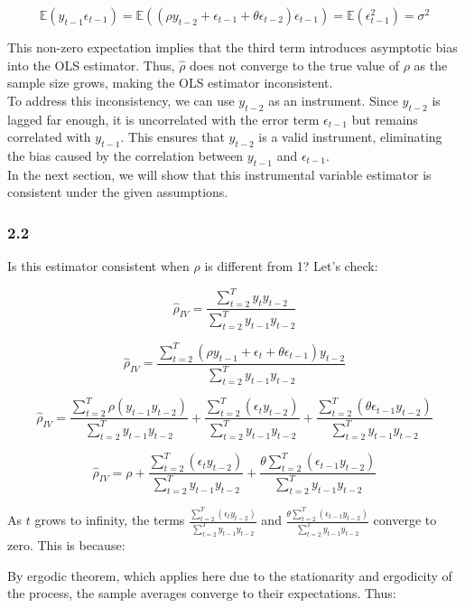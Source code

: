 \documentclass{article}
\begin{document}
\[
\mathbb{E}(y_{t-1}\epsilon_{t-1}) = \mathbb{E}((\rho y_{t-2} + \epsilon_{t-1} + \theta \epsilon_{t-2})\epsilon_{t-1}) = \mathbb{E}(\epsilon_{t-1}^{2}) = \sigma^{2}
\]

This non-zero expectation implies that the third term introduces asymptotic bias into the OLS estimator. Thus, $\hat{\rho}$ does not converge to the true value of $\rho$ as the sample size grows, making the OLS estimator inconsistent. \\

To address this inconsistency, we can use $y_{t-2}$ as an instrument. Since $y_{t-2}$ is lagged far enough, it is uncorrelated with the error term $\epsilon_{t-1}$ but remains correlated with $y_{t-1}$. This ensures that $y_{t-2}$ is a valid instrument, eliminating the bias caused by the correlation between $y_{t-1}$ and $\epsilon_{t-1}$. \\

In the next section, we will show that this instrumental variable estimator is consistent under the given assumptions.

\subsubsection*{2.2}
Is this estimator consistent when $\rho$ is different from 1? Let's check:

\[
\hat{\rho}_{IV}= \frac{\sum_{t=2}^{T} y_{t}y_{t-2}}{\sum_{t=2}^{T} y_{t-1}y_{t-2}}
\]

\[
\hat{\rho}_{IV}= \frac{\sum_{t=2}^{T} (\rho y_{t-1} + \epsilon_{t}+ \theta \epsilon_{t-1} )y_{t-2}}{\sum_{t=2}^{T} y_{t-1}y_{t-2}}
\]

\[
\hat{\rho}_{IV}= \frac{\sum_{t=2}^{T} \rho (y_{t-1}y_{t-2})}{\sum_{t=2}^{T} y_{t-1}y_{t-2}}+\frac{\sum_{t=2}^{T} (\epsilon_{t}y_{t-2})}{\sum_{t=2}^{T} y_{t-1}y_{t-2}}+ \frac{\sum_{t=2}^{T} (\theta\epsilon_{t-1}y_{t-2})}{\sum_{t=2}^{T} y_{t-1}y_{t-2}}
\]

\[
\hat{\rho}_{IV}= \rho +\frac{\sum_{t=2}^{T} (\epsilon_{t}y_{t-2})}{\sum_{t=2}^{T} y_{t-1}y_{t-2}}+ \frac{\theta\sum_{t=2}^{T} (\epsilon_{t-1}y_{t-2})}{\sum_{t=2}^{T} y_{t-1}y_{t-2}}
\]

As $t$ grows to infinity, the terms $\frac{\sum_{t=2}^{T} (\epsilon_{t}y_{t-2})}{\sum_{t=2}^{T} y_{t-1}y_{t-2}}$ and $\frac{\theta\sum_{t=2}^{T} (\epsilon_{t-1}y_{t-2})}{\sum_{t=2}^{T} y_{t-1}y_{t-2}}$ converge to zero. This is because:

By ergodic theorem, which applies here due to the stationarity and ergodicity of the process, the sample averages converge to their expectations. Thus:
\end{document}
